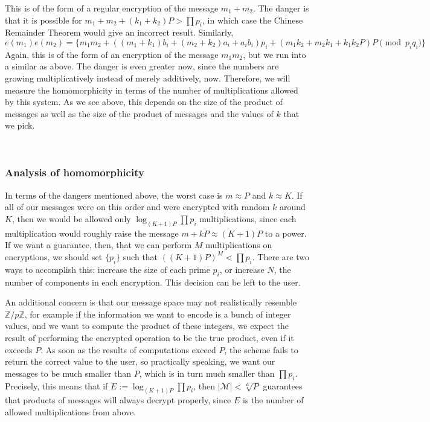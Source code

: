\documentclass[11pt]{report}
\newcommand{\M}{\mathcal{M}}
\newcommand{\Zp}{\mathbb{Z}/p\mathbb{Z}}
\begin{document}
This is of the form of a regular encryption of the message $m_1+m_2$. The danger is that it is possible for $m_1+m_2+(k_1+k_2)P>\prod p_i$, in which case the Chinese Remainder Theorem would give an incorrect result. Similarly,
\begin{equation} e(m_1)e(m_2) = \{m_1m_2+((m_1+k_1)b_i+(m_2+k_2)a_i+a_ib_i)p_i+(m_1k_2+m_2k_1+k_1k_2P)P \pmod{p_iq_i}\}\end{equation}
Again, this is of the form of an encryption of the message $m_1m_2$, but we run into a similar as above. The danger is even greater now, since the numbers are growing multiplicatively instead of merely additively, now. Therefore, we will measure the homomorphicity in terms of the number of multiplications allowed by this system. As we see above, this depends on the size of the product of messages as well as the size of the product of messages and the values of $k$ that we pick.

\

\subsubsection{Analysis of homomorphicity}

In terms of the dangers mentioned above, the worst case is $m\approx P$ and $k\approx K$. If all of our messages were on this order and were encrypted with random $k$ around $K$, then we would be allowed only $\log_{(K+1)P}\prod p_i$ multiplications, since each multiplication would roughly raise the message $m+kP \approx (K+1)P$ to a power. If we want a guarantee, then, that we can perform $M$ multiplications on encryptions, we should set $\{p_i\}$ such that $((K+1)P)^M < \prod p_i$. There are two ways to accomplish this: increase the size of each prime $p_i$, or increase $N$, the number of components in each encryption. This decision can be left to the user.

An additional concern is that our message space may not realistically resemble $\Zp$, for example if the information we want to encode is a bunch of integer values, and we want to compute the product of these integers, we expect the result of performing the encrypted operation to be the true product, even if it exceeds $P$. As soon as the results of computations exceed $P$, the scheme fails to return the correct value to the user, so practically speaking, we want our messages to be much smaller than $P$, which is in turn much smaller than $\prod p_i$. Precisely, this means that if $E := \log_{(K+1)P}\prod p_i$, then $|\M|<\sqrt[E]{P}$ guarantees that products of messages will always decrypt properly, since $E$ is the number of allowed multiplications from above.
\end{document}
